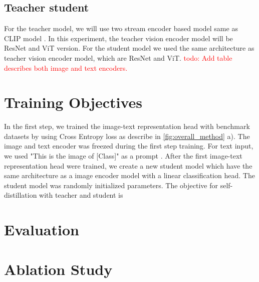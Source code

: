 \subsection{Teacher student}
For the teacher model, we will use two stream encoder based model same as CLIP model .
In this experiment, the teacher vision encoder model will be ResNet  and ViT  version.
For the student model we used the same architecture as teacher vision encoder model, which are ResNet and ViT.
\textcolor{red}{todo: Add table describes both image and text encoders.}

\section{Training Objectives}
In the first step, we trained the image-text representation head with benchmark datasets by using Cross Entropy loss as describe in \ref{fig:overall_method} a). The image and text encoder was freezed during the first step training. For text input, we used "This is the image of [Class]" as a prompt . After the first image-text representation head were trained, we create a new student model which have the same architecture as a image encoder model with a linear classification head. The student model was randomly initialized parameters. The objective for self-distillation with teacher and student is


\section{Evaluation}
\section{Ablation Study}

